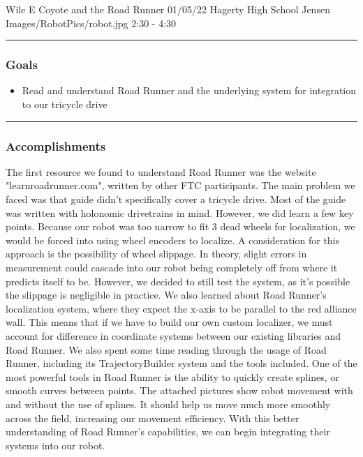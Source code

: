\insertmeeting 
	{Wile E Coyote and the Road Runner} 
	{01/05/22} 
	{Hagerty High School}
	{Jensen}
	{Images/RobotPics/robot.jpg}
	{2:30 - 4:30}
	
\noindent\hfil\rule{\textwidth}{.4pt}\hfil
\subsubsection*{Goals}
\begin{itemize}
    \item Read and understand Road Runner and the underlying system for integration to our tricycle drive 

\end{itemize} 

\noindent\hfil\rule{\textwidth}{.4pt}\hfil

\subsubsection*{Accomplishments}
The first resource we found to understand Road Runner was the website "learnroadrunner.com", written by other FTC participants. The main problem we faced was that guide didn't specifically cover a tricycle drive. Most of the guide was written with holonomic drivetrains in mind. However, we did learn a few key points. Because our robot was too narrow to fit 3 dead wheels for localization, we would be forced into using wheel encoders to localize. A consideration for this approach is the possibility of wheel slippage. In theory, slight errors in measurement could cascade into our robot being completely off from where it predicts itself to be. However, we decided to still test the system, as it's possible the slippage is negligible in practice. We also learned about Road Runner's localization system, where they expect the x-axis to be parallel to the red alliance wall. This means that if we have to build our own custom localizer, we must account for difference in coordinate systems between our existing libraries and Road Runner. We also spent some time reading through the usage of Road Runner, including its TrajectoryBuilder system and the tools included. One of the most powerful tools in Road Runner is the ability to quickly create splines, or smooth curves between points. The attached pictures show robot movement with and without the use of splines. It should help us move much more smoothly across the field, increasing our movement efficiency. With this better understanding of Road Runner's capabilities, we can begin integrating their systems into our robot. 
 

